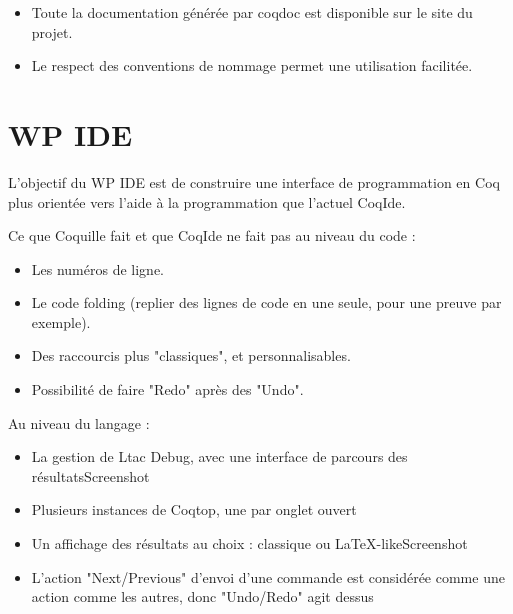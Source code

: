 \documentclass[slidetop]{beamer}
\begin{document}
\begin{frame}
\begin{itemize}
\item Toute la documentation générée par coqdoc est disponible sur le site du projet. 
\item Le respect des conventions de nommage permet une utilisation facilitée.
\end{itemize}
\end{frame}


\section{WP IDE}
\begin{frame}
L'objectif du WP IDE est de construire une interface de programmation en Coq plus orientée vers l'aide à la programmation que l'actuel CoqIde.
\end{frame}

\begin{frame}
Ce que Coquille fait et que CoqIde ne fait pas au niveau du code :
\begin{itemize}
    \item Les numéros de ligne.
    \item Le code folding (replier des lignes de code en une seule, pour une preuve par exemple).
    \item Des raccourcis plus "classiques", et personnalisables.
    \item Possibilité de faire "Redo" après des "Undo".
\end{itemize}
\end{frame}

\begin{frame}

Au niveau du langage :
\begin{itemize}
    \item La gestion de Ltac Debug, avec une interface de parcours des résultatsScreenshot
    \item Plusieurs instances de Coqtop, une par onglet ouvert
    \item Un affichage des résultats au choix : classique ou LaTeX-likeScreenshot
    \item L'action "Next/Previous" d'envoi d'une commande est considérée comme une action comme les autres, donc "Undo/Redo" agit dessus
\end{itemize}
 
\end{frame}
\end{document}
